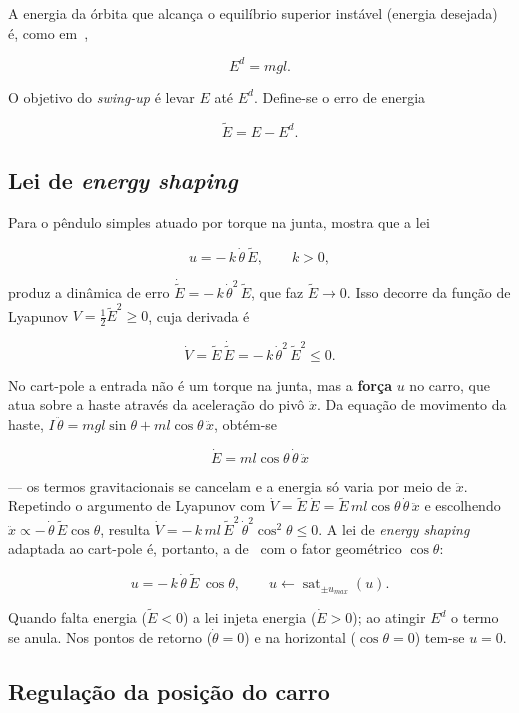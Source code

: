 \documentclass[brazil, 12pt]{article}
\begin{document}
A energia da órbita que alcança o equilíbrio superior instável (energia
desejada) é, como em~\cite{mit},

\[
E^{d} = m g l.
\]

O objetivo do \emph{swing-up} é levar $E$ até $E^{d}$. Define-se o erro de energia

\[
\tilde{E} = E - E^{d}.
\]

\subsection{Lei de \emph{energy shaping}}

Para o pêndulo simples atuado por torque na junta, \cite{mit} mostra que a lei

\[
u = -\,k\,\dot{\theta}\,\tilde{E}, \qquad k>0,
\]

produz a dinâmica de erro $\dot{\tilde{E}} = -\,k\,\dot{\theta}^{2}\,\tilde{E}$,
que faz $\tilde{E}\to 0$. Isso decorre da função de Lyapunov
$V = \tfrac{1}{2}\tilde{E}^{2}\ge 0$, cuja derivada é

\[
\dot{V} = \tilde{E}\,\dot{\tilde{E}}
        = -\,k\,\dot{\theta}^{2}\,\tilde{E}^{2} \le 0.
\]

No cart-pole a entrada não é um torque na junta, mas a \textbf{força} $u$ no
carro, que atua sobre a haste através da aceleração do pivô $\ddot{x}$. Da
equação de movimento da haste,
$I\,\ddot{\theta} = m g l\sin\theta + m l\cos\theta\,\ddot{x}$, obtém-se

\[
\boxed{\;\dot{E} = m l\cos\theta\,\dot{\theta}\,\ddot{x}\;}
\]

— os termos gravitacionais se cancelam e a energia só varia por meio de
$\ddot{x}$. Repetindo o argumento de Lyapunov com
$\dot{V} = \tilde{E}\,\dot{E} = \tilde{E}\,m l\cos\theta\,\dot{\theta}\,\ddot{x}$
e escolhendo $\ddot{x}\propto -\,\dot{\theta}\,\tilde{E}\cos\theta$, resulta
$\dot{V} = -\,k\,m l\,\tilde{E}^{2}\,\dot{\theta}^{2}\cos^{2}\theta \le 0$. A lei
de \emph{energy shaping} adaptada ao cart-pole é, portanto, a de~\cite{mit} com
o fator geométrico $\cos\theta$:

\[
\boxed{\;u = -\,k\,\dot{\theta}\,\tilde{E}\,\cos\theta,
\qquad u \leftarrow \operatorname{sat}_{\pm u_{max}}(u).\;}
\]

Quando falta energia ($\tilde{E}<0$) a lei injeta energia
($\dot{E}>0$); ao atingir $E^{d}$ o termo se anula. Nos pontos de retorno
($\dot{\theta}=0$) e na horizontal ($\cos\theta=0$) tem-se $u=0$.

\subsection{Regulação da posição do carro}
\end{document}
